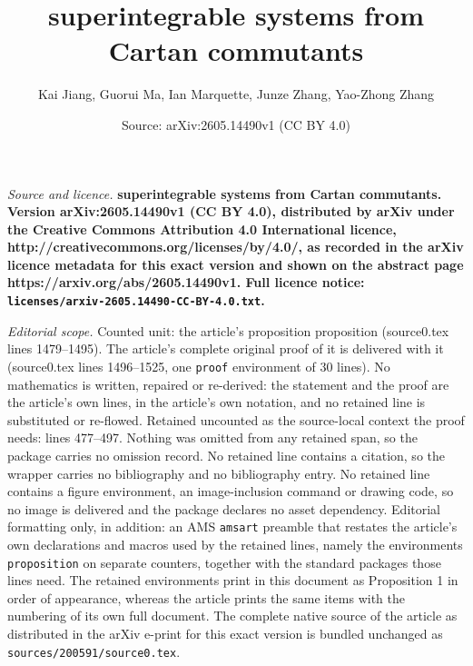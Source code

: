 \documentclass[10pt,a4paper]{amsart}
\title{\bf superintegrable systems from Cartan commutants}
\author{Kai Jiang, Guorui Ma, Ian Marquette, Junze Zhang, Yao-Zhong Zhang}
\date{Source: arXiv:2605.14490v1 (CC BY 4.0)}
\begin{document}
\maketitle

\noindent\emph{Source and licence.} \bf superintegrable systems from Cartan commutants. Version arXiv:2605.14490v1 (CC BY 4.0), distributed by arXiv under the Creative Commons Attribution 4.0 International licence, http://creativecommons.org/licenses/by/4.0/, as recorded in the arXiv licence metadata for this exact version and shown on the abstract page https://arxiv.org/abs/2605.14490v1. Full licence notice: \texttt{licenses/arxiv-2605.14490-CC-BY-4.0.txt}.\par\smallskip

\noindent\textit{Editorial scope.} Counted unit: the article's proposition proposition (source0.tex lines 1479--1495). The article's complete original proof of it is delivered with it (source0.tex lines 1496--1525, one \texttt{proof} environment of 30 lines). No mathematics is written, repaired or re-derived: the statement and the proof are the article's own lines, in the article's own notation, and no retained line is substituted or re-flowed.  Retained uncounted as the source-local context the proof needs: lines 477--497.  Nothing was omitted from any retained span, so the package carries no omission record.  No retained line contains a citation, so the wrapper carries no bibliography and no bibliography entry.  No retained line contains a figure environment, an image-inclusion command or drawing code, so no image is delivered and the package declares no asset dependency.  Editorial formatting only, in addition: an AMS \texttt{amsart} preamble that restates the article's own declarations and macros used by the retained lines, namely the environments \texttt{proposition} on separate counters, together with the standard packages those lines need.  The retained environments print in this document as Proposition 1 in order of appearance, whereas the article prints the same items with the numbering of its own full document.  The complete native source of the article as distributed in the arXiv e-print for this exact version is bundled unchanged as \texttt{sources/200591/source0.tex}.
\end{document}
